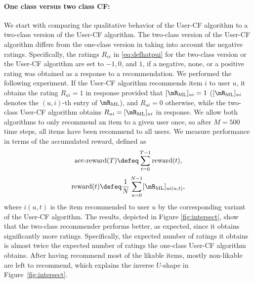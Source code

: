 \documentclass{article}
\newcommand\ocrating{R}
\begin{document}
\paragraph{One class versus two class CF:}
We start with comparing the qualitative behavior of the User-CF algorithm to a two-class version of the User-CF algorithm. 
The two-class version of the User-CF algorithm differs from the one-class version in taking into account the negative ratings. Specifically, the ratings $\ocrating_{vi}$ in \eqref{eq:defhatpui} for the two-class version or the User-CF algorithm are set to $-1,0$, and $1$, if a negative, none, or a positive rating was obtained as a response to a recommendation. 
%
We performed the following experiment. 
If the User-CF algorithm recommends item $i$ to user $u$, it obtains the rating $\ocrating_{ui} = 1$ in response provided that $[\RML]_{ui}=1$ ($[\RML]_{ui}$ denotes the $(u,i)$-th entry of $\RML$), and $\ocrating_{ui} = 0$ otherwise, while the two-class User-CF algorithm obtains $\ocrating_{ui}=[\RML]_{ui}$ in response. 
We allow both algorithms to only recommend an item to a given user once, so after $M=500$ time steps, all items have been recommend to all users. 
We measure performance in terms of the accumulated reward, defined as
\begin{align*}
\text{acc-reward}(T) \defeq \sum_{t=0}^{T-1} \mathrm{reward}(t), 
\end{align*}
\begin{align}
\label{eq:defrewardnr} 
\mathrm{reward}(t) \defeq \frac{1}{N} \sum_{u=0}^{N-1} [\RML]_{u i(u,t)},
\end{align}
where $i(u,t)$ is the item recommended to user $u$ by the corresponding variant of the User-CF algorithm. 
The results, depicted in Figure \ref{fig:intersect}, show that the two-class recommender performs better, 
as expected, since it obtains significantly more ratings. 
Specifically, the expected number of ratings it obtains is almost twice the expected number of ratings the one-class User-CF algorithm obtains. 
After having recommend most of the likable items, mostly non-likable are left to recommend, which explains the inverse $U$-shape in Figure~\ref{fig:intersect}. %
\end{document}
